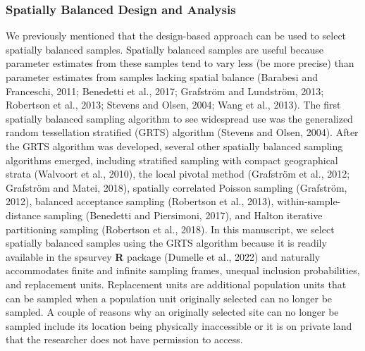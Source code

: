\documentclass[]{elsarticle} %
\begin{document}
\hypertarget{subsec:spb_design}{%
\subsubsection{Spatially Balanced Design and
Analysis}\label{subsec:spb_design}}

We previously mentioned that the design-based approach can be used to
select spatially balanced samples. Spatially balanced samples are useful
because parameter estimates from these samples tend to vary less (be
more precise) than parameter estimates from samples lacking spatial
balance (Barabesi and Franceschi, 2011; Benedetti et al., 2017;
Grafström and Lundström, 2013; Robertson et al., 2013; Stevens and
Olsen, 2004; Wang et al., 2013). The first spatially balanced sampling
algorithm to see widespread use was the generalized random tessellation
stratified (GRTS) algorithm (Stevens and Olsen, 2004). After the GRTS
algorithm was developed, several other spatially balanced sampling
algorithms emerged, including stratified sampling with compact
geographical strata (Walvoort et al., 2010), the local pivotal method
(Grafström et al., 2012; Grafström and Matei, 2018), spatially
correlated Poisson sampling (Grafström, 2012), balanced acceptance
sampling (Robertson et al., 2013), within-sample-distance sampling
(Benedetti and Piersimoni, 2017), and Halton iterative partitioning
sampling (Robertson et al., 2018). In this manuscript, we select
spatially balanced samples using the GRTS algorithm because it is
readily available in the spsurvey \textbf{\textsf{R}} package (Dumelle
et al., 2022) and naturally accommodates finite and infinite sampling
frames, unequal inclusion probabilities, and replacement units.
Replacement units are additional population units that can be sampled
when a population unit originally selected can no longer be sampled. A
couple of reasons why an originally selected site can no longer be
sampled include its location being physically inaccessible or it is on
private land that the researcher does not have permission to access.
\end{document}
